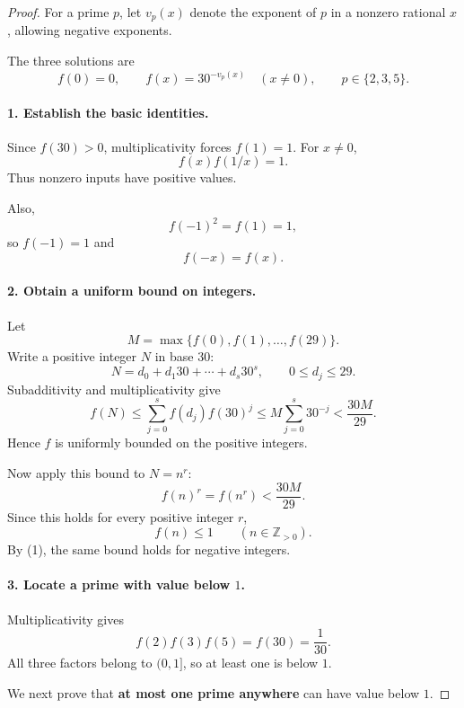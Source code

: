 
\begin{dlsummary}[title={\bfseries Solution 65. Three Hidden Primes},breakable]

\begin{proof}
For a prime \(p\), let \(v_p(x)\) denote the exponent of \(p\) in a nonzero rational \(x\), allowing negative exponents.

The three solutions are
\[
\boxed{
f(0)=0,\qquad f(x)=30^{-v_p(x)}\quad(x\ne0),
\qquad p\in\{2,3,5\}.
}
\]

\paragraph{1. Establish the basic identities.}

Since \(f(30)>0\), multiplicativity forces \(f(1)=1\). For \(x\ne0\),
\[
f(x)f(1/x)=1.
\]
Thus nonzero inputs have positive values.

Also,
\[
f(-1)^2=f(1)=1,
\]
so \(f(-1)=1\) and
\[
f(-x)=f(x). \tag{1}
\]

\paragraph{2. Obtain a uniform bound on integers.}

Let
\[
M=\max\{f(0),f(1),\ldots,f(29)\}.
\]
Write a positive integer \(N\) in base \(30\):
\[
N=d_0+d_1 30+\cdots+d_s30^s,
\qquad 0\le d_j\le29.
\]
Subadditivity and multiplicativity give
\[
f(N)
\le\sum_{j=0}^{s}f(d_j)f(30)^j
\le M\sum_{j=0}^{s}30^{-j}
<\frac{30M}{29}.
\]
Hence \(f\) is uniformly bounded on the positive integers.

Now apply this bound to \(N=n^r\):
\[
f(n)^r=f(n^r)<\frac{30M}{29}.
\]
Since this holds for every positive integer \(r\),
\[
\boxed{f(n)\le1\qquad(n\in\mathbb Z_{>0}).} \tag{2}
\]
By (1), the same bound holds for negative integers.

\paragraph{3. Locate a prime with value below \(1\).}

Multiplicativity gives
\[
f(2)f(3)f(5)=f(30)=\frac1{30}.
\]
All three factors belong to \((0,1]\), so at least one is below \(1\).

We next prove that \textbf{at most one prime anywhere} can have value below \(1\).


\end{proof}
\end{dlsummary}
